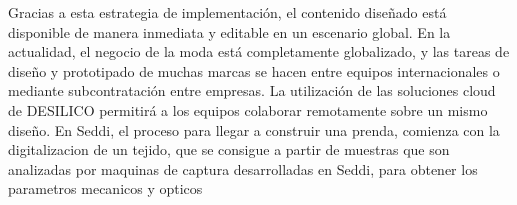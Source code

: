 Gracias a esta estrategia de implementación, el contenido diseñado está disponible de manera inmediata y editable en un escenario global. En la
actualidad, el negocio de la moda está completamente globalizado, y las tareas de diseño y prototipado de muchas marcas se hacen entre equipos
internacionales o mediante subcontratación entre empresas. La  utilización de las soluciones cloud de DESILICO permitirá a los equipos colaborar remotamente sobre un mismo diseño.
En Seddi, el proceso para llegar a construir una prenda, comienza con la digitalizacion de un tejido, que se consigue a partir de muestras que
son analizadas por maquinas de captura desarrolladas en Seddi, para obtener los parametros mecanicos y opticos

